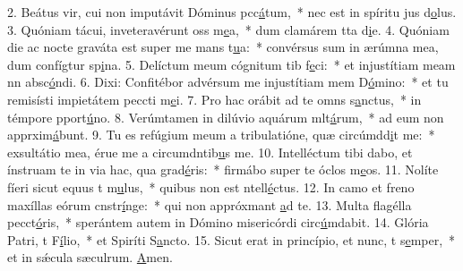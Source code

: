 2. Beátus vir, cui non imputávit Dóminus pcc\uline{á}tum,~* nec est in spíritu jus d\uline{o}lus.
3. Quóniam tácui, inveteravérunt oss m\uline{e}a,~* dum clamárem tta d\uline{i}e.
4. Quóniam die ac nocte graváta est super me mans t\uline{u}a:~* convérsus sum in ærúmna mea, dum confígtur sp\uline{i}na.
5. Delíctum meum cógnitum tib f\uline{e}ci:~* et injustítiam meam nn absc\uline{ó}ndi.
6. Dixi: Confitébor advérsum me injustítiam mem D\uline{ó}mino:~* et tu remisísti impietátem peccti m\uline{e}i.
7. Pro hac orábit ad te omns s\uline{a}nctus,~* in témpore pport\uline{ú}no.
8. Verúmtamen in dilúvio aquárum mlt\uline{á}rum,~* ad eum non apprxim\uline{á}bunt.
9. Tu es refúgium meum a tribulatióne, quæ circúmdd\uline{i}t me:~* exsultátio mea, érue me a circumdntib\uline{u}s me.
10. Intelléctum tibi dabo, et ínstruam te in via hac, qua grad\uline{é}ris:~* firmábo super te óclos m\uline{e}os.
11. Nolíte fíeri sicut equus t m\uline{u}lus,~* quibus non est ntell\uline{é}ctus.
12. In camo et freno maxíllas eórum cnstr\uline{í}nge:~* qui non appróxmant \uline{a}d te.
13. Multa flagélla pecct\uline{ó}ris,~* sperántem autem in Dómino misericórdi circ\uline{ú}mdabit.
14. Glória Patri, t F\uline{í}lio,~* et Spiríti S\uline{a}ncto.
15. Sicut erat in princípio, et nunc, t s\uline{e}mper,~* et in sǽcula sæculrum. \uline{A}men.
